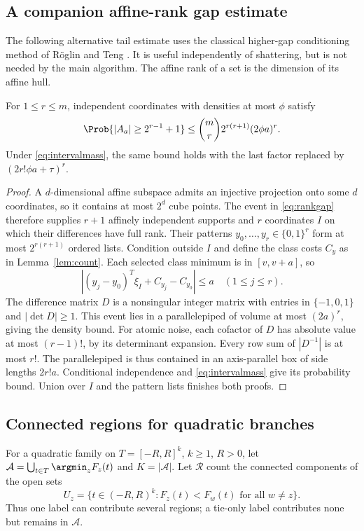 \subsection{A companion affine-rank gap estimate}
The following alternative tail estimate uses the classical higher-gap
conditioning method of R\"oglin and Teng \cite[Sections~6.1--6.2]{RoglinTeng}.
It is useful independently of shattering, but is not needed by the main
algorithm. The affine rank of a set is the dimension of its affine hull.

\begin{proposition}\label{prop:rankgap}
For $1\le r\le m$, independent coordinates with densities at most $\phi$
satisfy
\begin{equation}\label{eq:rankgap}
 \Prob\{|A_a|\ge2^{r-1}+1\}
 \le \binom{m}{r}2^{r(r+1)}(2\phi a)^r.
\end{equation}
Under \eqref{eq:intervalmass}, the same bound holds with the last factor
replaced by $(2r!\phi a+\tau)^r$.
\end{proposition}
\begin{proof}
A $d$-dimensional affine subspace admits an injective projection onto some
$d$ coordinates, so it contains at most $2^d$ cube points. The event in
\eqref{eq:rankgap} therefore supplies $r+1$ affinely independent supports
and $r$ coordinates $I$ on which their differences have full rank.
Their patterns $y_0,\ldots,y_r\in\{0,1\}^r$ form at most
$2^{r(r+1)}$ ordered lists. Condition outside $I$ and define the class
costs $C_y$ as in Lemma~\ref{lem:count}. Each selected class minimum is
in $[v,v+a]$, so
\[
 |(y_j-y_0)^T\xi_I+C_{y_j}-C_{y_0}|\le a
 \quad(1\le j\le r).
\]
The difference matrix $D$ is a nonsingular integer matrix with entries in
$\{-1,0,1\}$ and $|\det D|\ge1$. This event lies in a parallelepiped
of volume at most $(2a)^r$, giving the density bound. For atomic noise,
each cofactor of $D$ has absolute value at most $(r-1)!$, by its determinant
expansion. Every row sum of $|D^{-1}|$ is at most $r!$. The parallelepiped
is thus contained in an axis-parallel box of side lengths $2r!a$.
Conditional independence and \eqref{eq:intervalmass} give its probability
bound. Union over $I$ and the pattern lists finishes both proofs.
\end{proof}

\subsection{Connected regions for quadratic branches}
For a quadratic family on $T=[-R,R]^k$, $k\ge1$, $R>0$, let
$\mathcal A=\bigcup_{t\in T}\argmin_zF_z(t)$ and $K=|\mathcal A|$.
Let $\mathcal R$ count the connected components of the open sets
\[
 U_z=\{t\in(-R,R)^k:F_z(t)<F_w(t)\text{ for all }w\ne z\}.
\]
Thus one label can contribute several regions; a tie-only label contributes
none but remains in $\mathcal A$.

